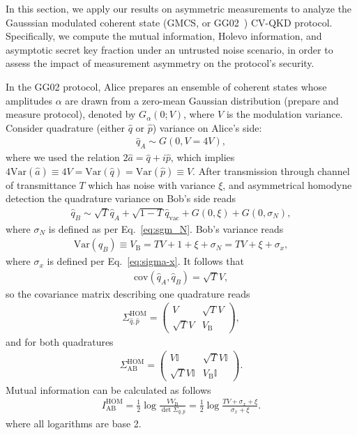 \documentclass[%
reprint,
superscriptaddress,
 amsmath,amssymb,amsfonts,
 aps,
 pra,
 longbibliography
]{revtex4-2}
\newcommand{\ind}[1]{\mathrm{#1}}
\begin{document}
In this section, we apply our results on asymmetric measurements to analyze the Gausssian modulated coherent state (GMCS, or GG02~\cite{PhysRevLett.88.057902}) CV-QKD protocol. Specifically, we compute the mutual information, Holevo information, and asymptotic secret key fraction under an untrusted noise scenario, in order to assess the impact of measurement asymmetry on the protocol’s security.

In the GG02 protocol, Alice prepares an ensemble of coherent states whose amplitudes $\alpha$ are drawn from a zero-mean Gaussian distribution (prepare and measure protocol), denoted by $G_\alpha(0;  V)$, where $ V$ is the modulation variance.
Consider quadrature (either $\hat{q}$ or $\hat{p}$) variance on Alice's side:
\begin{align}
  \label{eq:qA}
  \hat{q}_A\sim G(0,V=4V),
\end{align}
where we used the relation $2\hat{a}=\hat{q}+i\hat{p}$, which implies $4\ind{Var}(\hat{a})\equiv 4 V=\ind{Var}(\hat{q})=\ind{Var}(\hat{p})\equiv V$.
After transmission through channel of transmittance $T$ which has noise with variance $\xi$, and asymmetrical homodyne detection 
the quadrature variance on Bob's side reads
\begin{align}
  \label{eq:qB}
    \hat{q}_B\sim \sqrt{T}\hat{q}_A+
    \sqrt{1-T}\hat{q}_{\ind{vac}}+G(0,\xi)+G(0,\sigma_N),
\end{align}
where $\sigma_N$ is defined as per Eq.~\eqref{eq:sgm_N}.
Bob's variance reads
\begin{align}
  \label{eq:vb}
  \ind{Var} \left(\hat{q}_B\right)\equiv V_{\ind{B}} = TV+1+\xi+\sigma_N=TV+\xi+\sigma_x,
\end{align}
where $\sigma_x$ is defined per Eq.~\eqref{eq:sigma-x}.
It follows that
\begin{align}
  \label{eq:covqAqB}
  \ind{cov}(\hat{q}_A,\hat{q}_B)=\sqrt T V,
\end{align}
so the covariance matrix describing one quadrature reads
\begin{align}
  \label{eq:S_qp_hom}
    \Sigma_{\hat{q},\hat{p}}^{\ind{HOM}}=\begin{pmatrix}
        V&\sqrt TV\\
        \sqrt TV&V_{\ind{B}}
    \end{pmatrix},
\end{align}
and for both quadratures
\begin{align}
  \label{eq:S_hom}
\Sigma_{\ind{AB}}^{\ind{HOM}}=\begin{pmatrix}
        V\mathbb{I}&\sqrt TV\mathbb{I}\\
        \sqrt TV\mathbb{I}&V_{\ind{B}}\mathbb{I}
    \end{pmatrix}.
\end{align}
Mutual information can be calculated as follows \cite{SochEtAl2024_StatProofBook}
\begin{align}
\label{eq:IABPM}
    I_{\ind{AB}}^{\ind{HOM}}=\frac{1}{2}\log \frac{VV_{\ind{B}}}{\det\Sigma_{\hat{q},\hat{p}}}=\frac{1}{2}\log \frac{TV+\sigma_x+\xi}{\sigma_x+\xi}.
\end{align}
where all logarithms are base 2.
\end{document}
